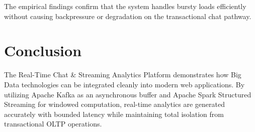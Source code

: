 \documentclass[11pt,a4paper]{article}
\begin{document}
The empirical findings confirm that the system handles bursty loads efficiently without causing backpressure or degradation on the transactional chat pathway.

\section{Conclusion}
The Real-Time Chat \& Streaming Analytics Platform demonstrates how Big Data technologies can be integrated cleanly into modern web applications. By utilizing Apache Kafka as an asynchronous buffer and Apache Spark Structured Streaming for windowed computation, real-time analytics are generated accurately with bounded latency while maintaining total isolation from transactional OLTP operations.
\end{document}

